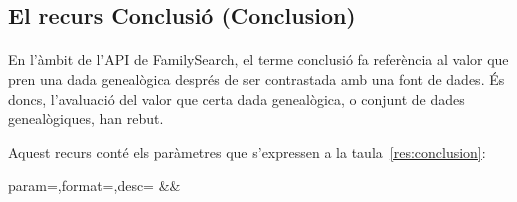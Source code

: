 \subsection{El recurs Conclusió (Conclusion)}

    \paragraph{}
    En l'àmbit de l'API de FamilySearch, el terme conclusió fa referència al valor que pren una dada genealògica després de ser contrastada amb una font de dades. És doncs, l'avaluació del valor que certa dada genealògica, o conjunt de dades genealògiques, han rebut.

    Aquest recurs conté els paràmetres que s'expressen a la taula~\ref{res:conclusion}:

    \begin{center}
             {param=\param,format=\format,desc=\desc}
             {\param&\format&\desc}
     \end{center}
